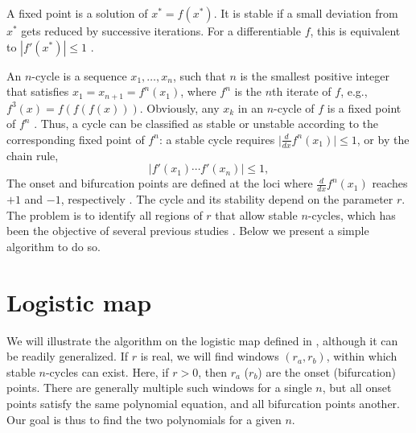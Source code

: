\documentclass{ws-ijbc}
\begin{document}
A fixed point is a solution of $x^* = f(x^*)$.
%
It is stable if a small deviation from $x^*$
  gets reduced by successive iterations.
%
For a differentiable $f$,
  this is equivalent to $|f'(x^*)| \le 1$
  \cite{strogatz}.


An $n$-cycle is a sequence $x_1, \dots, x_n$,
  such that $n$ is the smallest positive integer
  that satisfies $x_1 = x_{n+1} = f^n(x_1)$,
  where $f^n$ is the $n$th iterate of $f$,
  e.g., $f^3(x) = f(f(f(x)))$.
Obviously, any $x_k$ in an $n$-cycle of $f$ is a fixed point of $f^n$
%
\big[but the converse is untrue, for a fixed point of $f^n$
  can also be a fixed point of $f^d$ for a divisor $d$ of $n$:
  if $f^d(x) = x$, then $f^n(x) = f^d(\cdots f^d(x)\cdots) = x$\big].
%
%
Thus, a cycle can be classified as stable or unstable
  according to the corresponding fixed point of $f^n$:
  a stable cycle requires
  $\big| \frac {d} {dx} f^n(x_1) \big| \le 1$,
  or by the chain rule,
%
%
%
\begin{equation}
  \Big| f'(x_1) \cdots f'(x_n) \Big| \le 1,
\label{eq:der}
\end{equation}
%
%
The onset and bifurcation points
  are defined at the loci
  where $\frac {d} {dx} f^n(x_1)$ reaches $+1$ and $-1$,
  respectively \cite{strogatz}.
%
%
%
The cycle and its stability depend on the parameter $r$.
%
The problem is to identify
  all regions of $r$ that allow stable $n$-cycles,
  which has been the objective of several previous
  studies
  \cite{brown1, brown2, stephenson1, stephenson2, stephenson3,
  saha, bechhoefer, gordon, burm, zhang, bailey1, bailey2, kk1, lewis}.
Below we present a simple algorithm to do so.









\section{\label{sec:logmap}Logistic map}


We will illustrate the algorithm on the logistic map%
  defined in ,
  although it can be readily generalized.
%
If $r$ is real,
  we will find windows $(r_a, r_b)$,
    within which stable $n$-cycles can exist.
%
Here, if $r > 0$, then
  $r_a$ ($r_b$) are the onset (bifurcation) points.
%
There are generally multiple such windows for a single $n$,
  but all onset points satisfy the same polynomial equation,
  and all bifurcation points another.
%
Our goal is thus to find the two polynomials for a given $n$.
\end{document}
